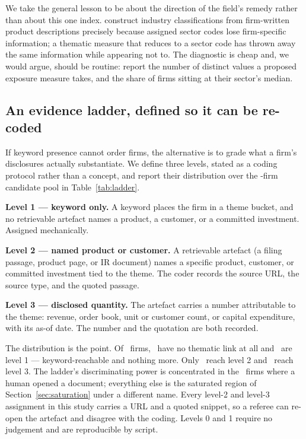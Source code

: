 \documentclass[a4paper,11pt]{article}
\begin{document}
We take the general lesson to be about the direction of the field's remedy rather than about this one
index. \citet{HobergPhillips2016} construct industry classifications from firm-written product
descriptions precisely because assigned sector codes lose firm-specific information; a thematic
measure that reduces to a sector code has thrown away the same information while appearing not to.
The diagnostic is cheap and, we would argue, should be routine: report the number of distinct values a
proposed exposure measure takes, and the share of firms sitting at their sector's median.



\subsection{An evidence ladder, defined so it can be re-coded}\label{sec:ladder}

If keyword presence cannot order firms, the alternative is to grade what a firm's disclosures actually
substantiate. We define three levels, stated as a coding protocol rather than a concept, and report
their distribution over the \LadderPool-firm candidate pool in Table~\ref{tab:ladder}.

\textbf{Level 1 --- keyword only.} A keyword places the firm in a theme bucket, and no retrievable
artefact names a product, a customer, or a committed investment. Assigned mechanically.

\textbf{Level 2 --- named product or customer.} A retrievable artefact (a filing passage, product
page, or IR document) names a specific product, customer, or committed investment tied to the theme.
The coder records the source URL, the source type, and the quoted passage.

\textbf{Level 3 --- disclosed quantity.} The artefact carries a number attributable to the theme:
revenue, order book, unit or customer count, or capital expenditure, with its as-of date. The number
and the quotation are both recorded.

The distribution is the point. Of \LadderPool\ firms, \LadderLzero\ have no thematic link at all and
\LadderLone\ are level 1 --- keyword-reachable and nothing more. Only \LadderLtwo\ reach level 2 and
\LadderLthree\ reach level 3. The ladder's discriminating power is concentrated in the
\LadderVerified\ firms where a human opened a document; everything else is the saturated region of
Section~\ref{sec:saturation} under a different name. Every level-2 and level-3 assignment in this
study carries a URL and a quoted snippet, so a referee can re-open the artefact and disagree with the
coding. Levels 0 and 1 require no judgement and are reproducible by script.
\end{document}
